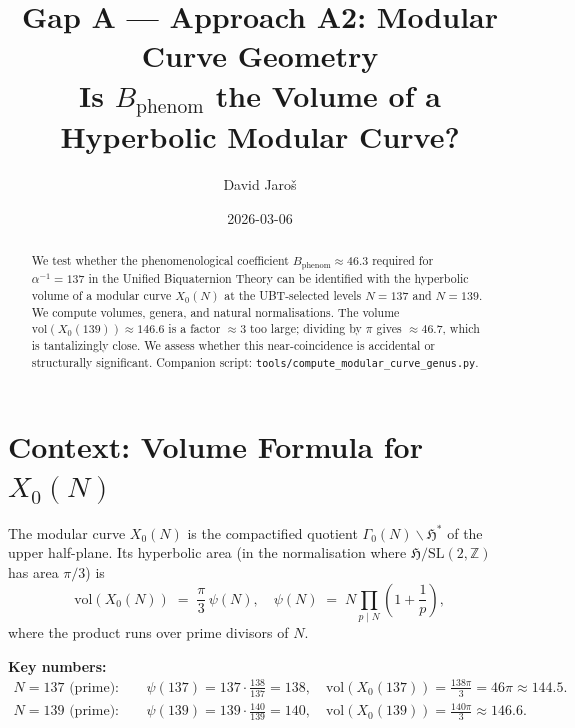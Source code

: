\documentclass[12pt,a4paper]{article}
\title{\textbf{Gap A --- Approach A2: Modular Curve Geometry}\\
         \large Is $B_{\mathrm{phenom}}$ the Volume of a Hyperbolic Modular Curve?}
\author{David Jaro\v{s}}
\date{2026-03-06}
\theoremstyle{definition}
\theoremstyle{remark}
\begin{document}
  \maketitle

  \begin{abstract}
  We test whether the phenomenological coefficient $B_{\mathrm{phenom}} \approx 46.3$
  required for $\alpha^{-1} = 137$ in the Unified Biquaternion Theory can be
  identified with the hyperbolic volume of a modular curve $X_0(N)$ at the
  UBT-selected levels $N = 137$ and $N = 139$.  We compute volumes, genera, and
  natural normalisations.  The volume $\mathrm{vol}(X_0(139)) \approx 146.6$ is
  a factor $\approx 3$ too large; dividing by $\pi$ gives $\approx 46.7$, which is
  tantalizingly close.  We assess whether this near-coincidence is accidental or
  structurally significant.  Companion script:
  \texttt{tools/compute\_modular\_curve\_genus.py}.
  \end{abstract}
\fi

\section{Context: Volume Formula for $X_0(N)$}
\label{sec:context}

The modular curve $X_0(N)$ is the compactified quotient
$\Gamma_0(N)\backslash\mathfrak{H}^*$ of the upper half-plane.  Its hyperbolic
area (in the normalisation where $\mathfrak{H}/\mathrm{SL}(2,\mathbb{Z})$ has
area $\pi/3$) is
\begin{equation}
  \mathrm{vol}(X_0(N))
  \;=\; \frac{\pi}{3}\,\psi(N),
  \quad
  \psi(N) \;=\; N \prod_{p \mid N} \!\left(1 + \frac{1}{p}\right),
  \label{eq:vol_formula}
\end{equation}
where the product runs over prime divisors of $N$.

\begin{insightbox}
\textbf{Key numbers:}
\begin{align*}
  N = 137 \text{ (prime)}: &\quad
    \psi(137) = 137\cdot\tfrac{138}{137} = 138,
    \quad
    \mathrm{vol}(X_0(137)) = \tfrac{138\pi}{3} = 46\pi \approx 144.5 . \\
  N = 139 \text{ (prime)}: &\quad
    \psi(139) = 139\cdot\tfrac{140}{139} = 140,
    \quad
    \mathrm{vol}(X_0(139)) = \tfrac{140\pi}{3} \approx 146.6 .
\end{align*}
\end{insightbox}
\end{document}

